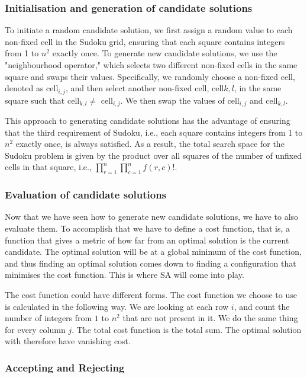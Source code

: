 \documentclass[11pt]{report}
\begin{document}
\subsubsection{Initialisation and generation of candidate solutions}


To initiate a random candidate solution, we first assign a random value to each non-fixed cell in the Sudoku grid, ensuring that each square contains integers from 1 to $n^2$ exactly once. To generate new candidate solutions, we use the "neighbourhood operator," which selects two different non-fixed cells in the same square and swaps their values. Specifically, we randomly choose a non-fixed cell, denoted as cell$_{i,j}$, and then select another non-fixed cell, cell${k,l}$, in the same square such that cell$_{k,l}\neq$ cell$_{i,j}$. We then swap the values of cell$_{i,j}$ and cell$_{k,l}$.

This approach to generating candidate solutions has the advantage of ensuring that the third requirement of Sudoku, i.e., each square contains integers from 1 to $n^2$ exactly once, is always satisfied. As a result, the total search space for the Sudoku problem is given by the product over all squares of the number of unfixed cells in that square, i.e., $\prod_{r=1}^n\prod_{c=1}^nf(r,c)!$.


\subsubsection{Evaluation of candidate solutions}

Now that we have seen how to generate new candidate solutions, we have to also evaluate them. To accomplish that we have to define a cost function, that is, a function that gives a metric of how far from an optimal solution is the current candidate. The optimal solution will be at a global minimum of the cost function, and thus finding an optimal solution comes down to finding a configuration that minimises the cost function. This is where SA will come into play.

The cost function could have different forms. The cost function we choose to use is calculated in the following way. We are looking at each row $i$, and count the number of integers from $1 $ to $n^2$ that are not present in it. We do the same thing for every column $j$. The total cost function is the total sum. The optimal solution with therefore have vanishing cost.


\subsubsection{Accepting and Rejecting}
\end{document}

